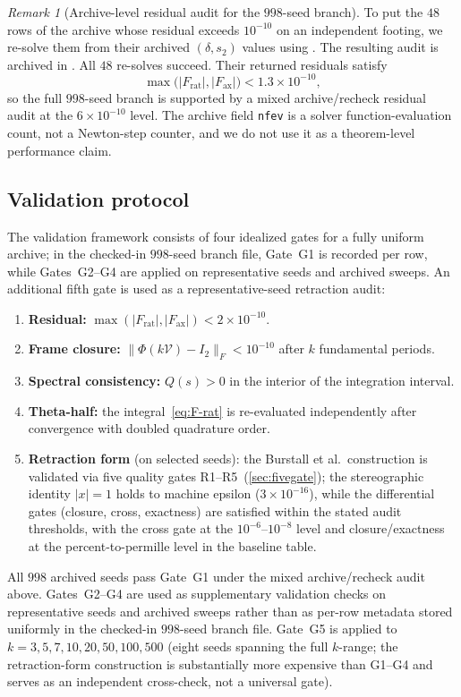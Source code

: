 \documentclass[11pt,a4paper]{article}
\theoremstyle{plain}
\theoremstyle{definition}
\theoremstyle{remark}
\newtheorem{remark}[theorem]{Remark}
\newcommand{\abs}[1]{\lvert #1 \rvert}
\newcommand{\norm}[1]{\lVert #1 \rVert}
\begin{document}
\begin{remark}[Archive-level residual audit for the $998$-seed branch]
  To put the $48$ rows of the archive whose residual exceeds $10^{-10}$
  on an independent footing, we re-solve them from their archived
  $(\delta,s_2)$ values using
  .  The resulting audit
  is archived in
  .
  All $48$ re-solves succeed.  Their returned residuals satisfy
  \[
    \max\bigl(\abs{F_{\mathrm{rat}}},\abs{F_{\mathrm{ax}}}\bigr)
    < 1.3\times 10^{-10},
  \]
  so the full $998$-seed branch is supported by a mixed archive/recheck
  residual audit at the $6\times 10^{-10}$ level.  The archive field
  \texttt{nfev} is a solver function-evaluation count, not a Newton-step
  counter, and we do not use it as a theorem-level performance claim.
\end{remark}

\subsection{Validation protocol}\label{sec:validation}
The validation framework consists of four idealized gates for a fully
uniform archive; in the checked-in $998$-seed branch file, Gate~G1 is
recorded per row, while Gates~G2--G4 are applied on representative seeds
and archived sweeps.  An additional fifth gate is used as a
representative-seed retraction audit:
\begin{enumerate}[nosep,label=\textbf{G\arabic*.}]
\item \textbf{Residual:}
  $\max(\abs{F_{\mathrm{rat}}}, \abs{F_{\mathrm{ax}}}) < 2\times 10^{-10}$.
\item \textbf{Frame closure:}
  $\norm{\Phi(k\mathcal{V}) - I_2}_F < 10^{-10}$
  after $k$ fundamental periods.
\item \textbf{Spectral consistency:}
  $Q(s) > 0$ in the interior of the integration interval.
\item \textbf{Theta-half:}
  the integral~\eqref{eq:F-rat} is re-evaluated independently after
  convergence with doubled quadrature order.
\item \textbf{Retraction form} (on selected seeds):
  the Burstall et al.\ construction is validated via five quality
  gates R1--R5~(\cref{sec:fivegate}); the stereographic identity
  $\abs{x}=1$ holds to machine epsilon ($3 \times 10^{-16}$),
  while the differential gates (closure, cross, exactness) are
  satisfied within the stated audit thresholds, with the cross gate at
  the $10^{-6}$--$10^{-8}$ level and closure/exactness at the
  percent-to-permille level in the baseline table.
\end{enumerate}
All $998$ archived seeds pass Gate~G1 under the mixed archive/recheck
audit above.  Gates~G2--G4 are used as supplementary validation checks on
representative seeds and archived sweeps rather than as per-row metadata
stored uniformly in the checked-in $998$-seed branch file.
Gate~G5 is applied to
$k = 3, 5, 7, 10, 20, 50, 100, 500$
(eight seeds spanning the full $k$-range; the retraction-form
construction is substantially more expensive than G1--G4
and serves as an independent cross-check, not a universal gate).
\end{document}
